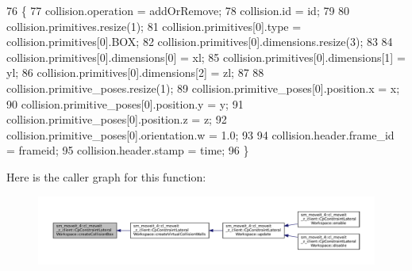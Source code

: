 \begin{DoxyCode}
76             \{
77                 collision.operation = addOrRemove;
78                 collision.id = id;
79 
80                 collision.primitives.resize(1);
81                 collision.primitives[0].type = collision.primitives[0].BOX;
82                 collision.primitives[0].dimensions.resize(3);
83 
84                 collision.primitives[0].dimensions[0] = xl;
85                 collision.primitives[0].dimensions[1] = yl;
86                 collision.primitives[0].dimensions[2] = zl;
87 
88                 collision.primitive\_poses.resize(1);
89                 collision.primitive\_poses[0].position.x = x;
90                 collision.primitive\_poses[0].position.y = y;
91                 collision.primitive\_poses[0].position.z = z;
92                 collision.primitive\_poses[0].orientation.w = 1.0;
93 
94                 collision.header.frame\_id = frameid;
95                 collision.header.stamp = time;
96             \}
\end{DoxyCode}
Here is the caller graph for this function\+:
\nopagebreak
\begin{figure}[H]
\begin{center}
\leavevmode
\includegraphics[width=350pt]{classsm__moveit__4_1_1cl__moveit__z__client_1_1CpConstraintLateralWorkspace_ac27089379dc98fbecf699b18e0797aba_icgraph}
\end{center}
\end{figure}
\mbox{\label{classsm__moveit__4_1_1cl__moveit__z__client_1_1CpConstraintLateralWorkspace_abb413c4d73a4f6c7f2feca86624b5c7a}} 
